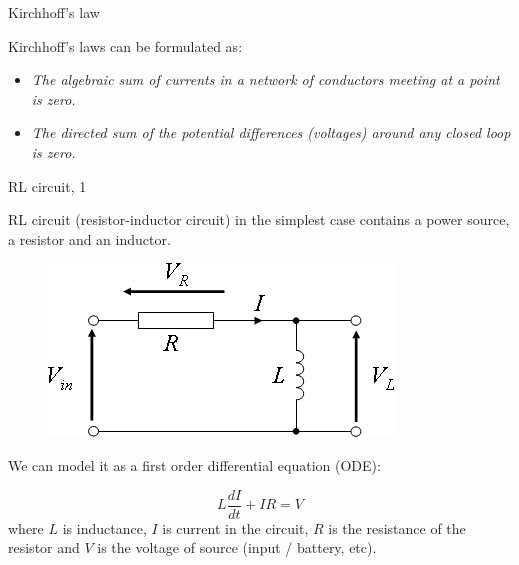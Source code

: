 \documentclass{beamer}
\begin{document}
\begin{frame}{Kirchhoff's law}
	\begin{flushleft}
		
		Kirchhoff's laws can be formulated as:
		
		\bigskip
		
		\begin{itemize}
			\item \emph{The algebraic sum of currents in a network of conductors meeting at a point is zero.}
			
			\item \emph{The directed sum of the potential differences (voltages) around any closed loop is zero.}
		\end{itemize}
		
		
	\end{flushleft}
\end{frame}



\begin{frame}{RL circuit, 1}
	\begin{flushleft}
		
		RL circuit (resistor-inductor circuit) in the simplest case contains a power source, a resistor and an inductor.
		
		\begin{figure}
			\centering
			\includegraphics[width=0.5\linewidth]{Series-RL}
			\label{fig:Series-RL}
		\end{figure}
		
		We can model it as a first order differential equation (ODE):
		
		\begin{equation}
			L \frac{dI}{dt} + IR = V
		\end{equation}
	where $L$ is inductance, $I$ is current in the circuit, $R$ is the resistance of the resistor and $V$ is the voltage of source (input / battery, etc).
		
	\end{flushleft}
\end{frame}
\end{document}
